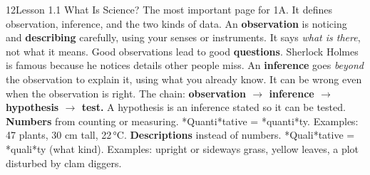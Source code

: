 \documentclass[11pt,letterpaper]{article}
\begin{document}
\begin{tbpage}{12}{Lesson 1.1 What Is Science?}
  {The most important page for 1A. It defines observation, inference, and the two kinds of data.}
    {An \textbf{observation} is noticing and \textbf{describing} carefully, using your senses or instruments. It says \emph{what is there}, not what it means.}
    {Good observations lead to good \textbf{questions}. Sherlock Holmes is famous because he notices details other people miss.}
    {An \textbf{inference} goes \emph{beyond} the observation to explain it, using what you already know. It can be wrong even when the observation is right.}
    {The chain: \textbf{observation $\rightarrow$ inference $\rightarrow$ hypothesis $\rightarrow$ test.} A hypothesis is an inference stated so it can be tested.}
    {\textbf{Numbers} from counting or measuring. *Quanti*tative = *quanti*ty. Examples: 47 plants, 30 cm tall, 22\,°C.}
    {\textbf{Descriptions} instead of numbers. *Quali*tative = *quali*ty (what kind). Examples: upright or sideways grass, yellow leaves, a plot disturbed by clam diggers.}
\end{tbpage}
\end{document}
